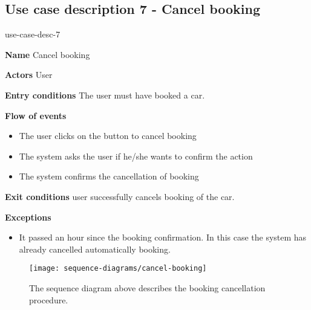 \subsection{Use case description 7 - Cancel booking}
\begin{labeling}{use-case-desc-7}
	\item[\textbf{Name}] Cancel booking
	\item[\textbf{Actors}] User
	\item[\textbf{Entry conditions}] The user must have booked a car.
	\item[\textbf{Flow of events}]
		\begin{itemize}
			\item[]
			\item The user clicks on the button to cancel booking
			\item The system asks the user if he/she wants to confirm the action
			\item The system confirms the cancellation of booking
		\end{itemize}
	\item[\textbf{Exit conditions}] user successfully cancels booking of the car.
	\item[\textbf{Exceptions}]
		\begin{itemize}
			\item[]
			\item It passed an hour since the booking confirmation. In this case the system has already cancelled automatically booking. 
		\end{itemize}
\end{labeling}
\begin{figure}[H]
	\centering
	\texttt{[image: sequence-diagrams/cancel-booking]}
	\caption[Sequence diagram - Cancel booking]{The sequence diagram above describes the booking cancellation procedure.}
	\label{fig:cancel-booking-sequence-diagram}
\end{figure}
\clearpage

